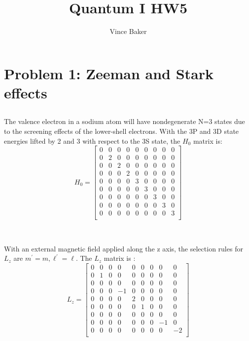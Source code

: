 \documentclass[a4paper,12pt]{article}
\title{Quantum I HW5}
\author{Vince Baker}
\numberwithin{equation}{section}
\begin{document}
\maketitle

\section{Problem 1: Zeeman and Stark effects}
\subsection{}
The valence electron in a sodium atom will have nondegenerate N=3 states due to the screening effects of the lower-shell electrons.
With the 3P and 3D state energies lifted by 2 and 3 with respect to the 3S state, the $H_0$ matrix is: 
\begin{equation}
H_0=
\begin{bmatrix}
 0 & 0 & 0 & 0 & 0 & 0 & 0 & 0 & 0 \\
 0 & 2 & 0 & 0 & 0 & 0 & 0 & 0 & 0 \\
 0 & 0 & 2 & 0 & 0 & 0 & 0 & 0 & 0 \\
 0 & 0 & 0 & 2 & 0 & 0 & 0 & 0 & 0 \\
 0 & 0 & 0 & 0 & 3 & 0 & 0 & 0 & 0 \\
 0 & 0 & 0 & 0 & 0 & 3 & 0 & 0 & 0 \\
 0 & 0 & 0 & 0 & 0 & 0 & 3 & 0 & 0 \\
 0 & 0 & 0 & 0 & 0 & 0 & 0 & 3 & 0 \\
 0 & 0 & 0 & 0 & 0 & 0 & 0 & 0 & 3 \\
\end{bmatrix}
\end{equation}
\\
\subsection{}
With an external magnetic field applied along the z axis, the selection rules for $L_z$ are $m^{'}=m, \ell ^{'}=\ell $.
The $L_z$ matrix is :
\begin{equation}
L_z=
\begin{bmatrix}
 0 & 0 & 0 & 0 & 0 & 0 & 0 & 0 & 0 \\
 0 & 1 & 0 & 0 & 0 & 0 & 0 & 0 & 0 \\
 0 & 0 & 0 & 0 & 0 & 0 & 0 & 0 & 0 \\
 0 & 0 & 0 & -1 & 0 & 0 & 0 & 0 & 0 \\
 0 & 0 & 0 & 0 & 2 & 0 & 0 & 0 & 0 \\
 0 & 0 & 0 & 0 & 0 & 1 & 0 & 0 & 0 \\
 0 & 0 & 0 & 0 & 0 & 0 & 0 & 0 & 0 \\
 0 & 0 & 0 & 0 & 0 & 0 & 0 & -1 & 0 \\
 0 & 0 & 0 & 0 & 0 & 0 & 0 & 0 & -2 \\
\end{bmatrix}
\end{equation}
\\
\end{document}
